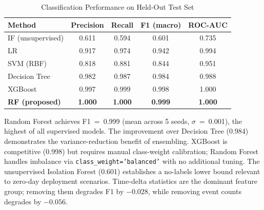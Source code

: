 \begin{table}[!t]
  \caption{Classification Performance on Held-Out Test Set}
  \label{tab:results}
  \centering
  \begin{tabular}{lcccc}
    \hline
    Method & Precision & Recall & F1 (macro) & ROC-AUC \\
    \hline
    IF (unsupervised)      & 0.611 & 0.594 & 0.601 & 0.735 \\
    LR                     & 0.917 & 0.974 & 0.942 & 0.994 \\
    SVM (RBF)              & 0.818 & 0.881 & 0.844 & 0.951 \\
    Decision Tree          & 0.982 & 0.987 & 0.984 & 0.988 \\
    XGBoost                & 0.997 & 0.999 & 0.998 & 1.000 \\
    \textbf{RF (proposed)} & \textbf{1.000} & \textbf{1.000} & \textbf{0.999} & \textbf{1.000} \\
    \hline
  \end{tabular}
\end{table}

Random Forest achieves F1~=~0.999 (mean across 5 seeds, $\sigma$~=~0.001), the
highest of all supervised models. The improvement over Decision Tree (0.984) demonstrates
the variance-reduction benefit of ensembling. XGBoost is competitive (0.998) but requires
manual class-weight calibration; Random Forest handles imbalance via \texttt{class\_weight='balanced'}
with no additional tuning. The unsupervised Isolation Forest (0.601) establishes a
no-labels lower bound relevant to zero-day deployment scenarios. Time-delta statistics are
the dominant feature group; removing them degrades F1 by $-0.028$, while removing event
counts degrades by $-0.056$.
